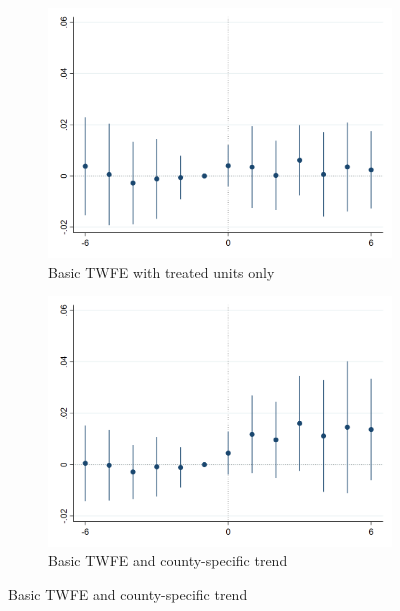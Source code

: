     \begin{figure}[h!] \centering
        \caption{Dynamic effects around selected minimum wage events}
        \label{fig:event_study_main}
        \begin{subfigure}{0.5\textwidth} \centering
            \includegraphics[width=0.95\linewidth]{analysis/event_study_exploration/output/last_rentpsqft_sfcc_zfe_w6.png}
            \caption{Basic TWFE with treated units only} \label{fig:event_study_treated}
        \end{subfigure}%
        \begin{subfigure}{0.5\textwidth} \centering
            \includegraphics[width=0.95\linewidth]{analysis/event_study_exploration/output/last_rentpsqft_sfcc_zfe_w6_county-trend.png}
            \caption{Basic TWFE and county-specific trend} \label{fig:event_study_treated_county-trends}

\end{subfigure}
\end{figure}
